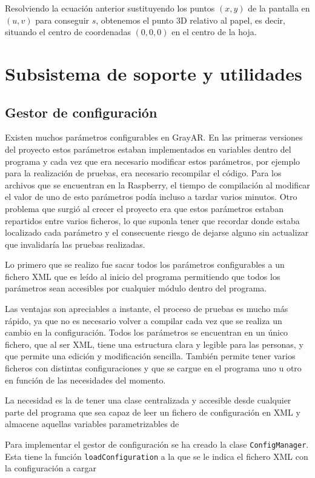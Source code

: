 Resolviendo la ecuación anterior sustituyendo los puntos $(x,y)$ de la
pantalla en $(u,v)$ para conseguir $s$, obtenemos el punto 3D relativo
al papel, es decir, situando el centro de coordenadas $(0,0,0)$ en el
centro de la hoja.



\section{Subsistema de soporte y utilidades}
\subsection{Gestor de configuración}
Existen muchos parámetros configurables en GrayAR. En las primeras versiones del proyecto estos parámetros estaban implementados en variables dentro del programa y cada vez que era necesario modificar estos parámetros, por ejemplo para la realización de pruebas, era necesario recompilar el código. Para los archivos que se encuentran en la Raspberry, el tiempo de compilación al modificar el valor de uno de esto parámetros podía incluso a tardar varios minutos. Otro problema que surgió al crecer el proyecto era que estos parámetros estaban repartidos entre varios ficheros, lo que suponla tener que recordar donde estaba localizado cada parámetro y el consecuente riesgo de dejarse alguno sin actualizar que invalidaría las pruebas realizadas.

Lo primero que se realizo fue sacar todos los parámetros configurables a un fichero \acs{XML} que es leído al inicio del programa permitiendo que todos los parámetros sean accesibles por cualquier módulo dentro del programa.

Las ventajas son apreciables a instante, el proceso de pruebas es mucho más rápido, ya que no es necesario volver a compilar cada vez que se realiza un cambio en la configuración. Todos los parámetros se encuentran en un único fichero, que al ser \acs{XML}, tiene una estructura clara y legible para las personas, y que permite una edición y modificación sencilla. También permite tener varios ficheros con distintas configuraciones y que se cargue en el programa uno u otro en función de las necesidades del momento.
 
La necesidad es la de tener una clase centralizada y accesible desde cualquier parte del programa que sea capaz de leer un fichero de configuración en \acs{XML} y almacene aquellas variables parametrizables de

Para implementar el gestor de configuración se ha creado la clase  \texttt{ConfigManager}. Esta tiene la función  \texttt{loadConfiguration} a la que se le indica el fichero \acs{XML} con la configuración a cargar 

